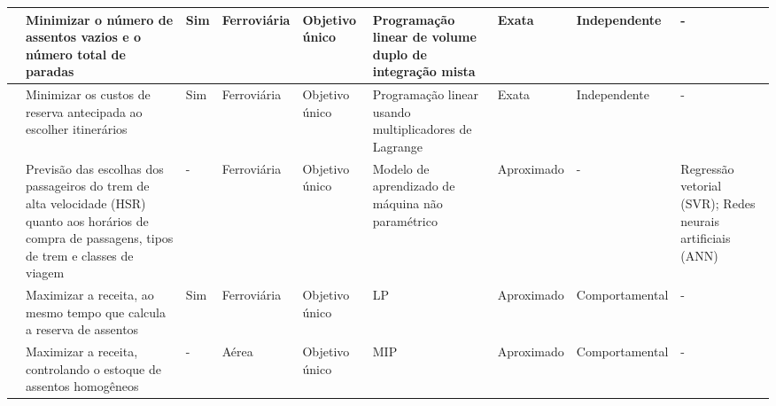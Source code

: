 \begin{center}
\begin{longtable}{|M{2cm}|M{3.7cm}|M{0.5cm}|M{1.1cm}|M{1cm}|M{2cm}|M{1.7cm}|M{1.7cm}|M{1.5cm}|}
		\citep{QI2018151}         &  Minimizar o número de assentos vazios e o número total de paradas                                                                                    & Sim                 & Ferroviária          &  Objetivo único          &  Programação linear de volume duplo de integração mista  & Exata                                           & Independente             & -                                                         \\ \hline
		\citep{XU201882}          &  Minimizar os custos de reserva antecipada ao escolher itinerários                                                                                    & Sim                 & Ferroviária          &  Objetivo único          &  Programação linear usando multiplicadores de Lagrange   & Exata                                           & Independente             & -                                                         \\ \hline
		\citep{SUN201896}         &  Previsão das escolhas dos passageiros do trem de alta velocidade (HSR) quanto aos horários de compra de passagens, tipos de trem e classes de viagem & -                   & Ferroviária          &  Objetivo único          &  Modelo de aprendizado de máquina não paramétrico        & Aproximado                                      & -                        &  Regressão vetorial (SVR); Redes neurais artificiais (ANN) \\ \hline
		\citep{ZHAO2019776}       &  Maximizar a receita, ao mesmo tempo que calcula a reserva de assentos                                                                                & Sim                 & Ferroviária          &  Objetivo único          &  LP                                                      & Aproximado                                      & Comportamental           & -                                                         \\ \hline
		\citep{BARBIER20201002}   &  Maximizar a receita, controlando o estoque de assentos homogêneos                                                                                    & -                   & Aérea                &  Objetivo único          &  MIP                                                     & Aproximado                                      & Comportamental           & -                                                         \\ \hline

\end{longtable}
\end{center}

